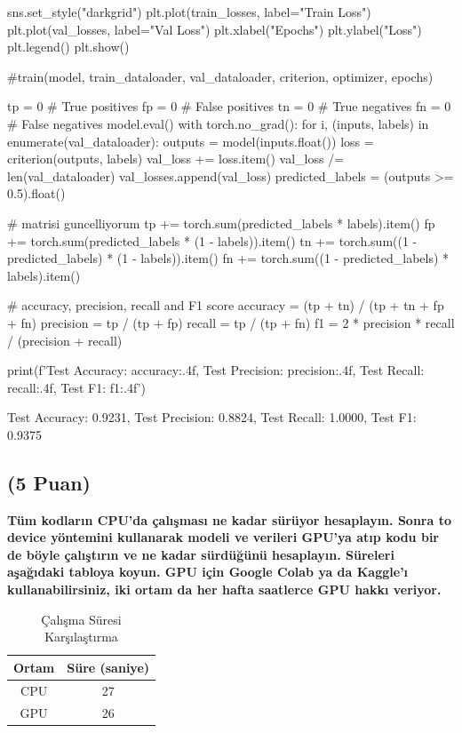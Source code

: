 \documentclass[11pt]{article}
\begin{document}
\begin{python}
sns.set_style("darkgrid")
plt.plot(train_losses, label="Train Loss")
plt.plot(val_losses, label="Val Loss")
plt.xlabel("Epochs")
plt.ylabel("Loss")
plt.legend()
plt.show()

#train(model, train_dataloader, val_dataloader, criterion, optimizer, epochs)



tp = 0  # True positives
fp = 0  # False positives
tn = 0  # True negatives
fn = 0  # False negatives
model.eval()
with torch.no_grad():
      for i, (inputs, labels) in enumerate(val_dataloader):
              outputs = model(inputs.float())
              loss = criterion(outputs, labels)
              val_loss += loss.item()
val_loss /= len(val_dataloader)
val_losses.append(val_loss)
predicted_labels = (outputs >= 0.5).float()



# matrisi guncelliyorum
tp += torch.sum(predicted_labels * labels).item()
fp += torch.sum(predicted_labels * (1 - labels)).item()
tn += torch.sum((1 - predicted_labels) * (1 - labels)).item()
fn += torch.sum((1 - predicted_labels) * labels).item()




# accuracy, precision, recall and F1 score
accuracy = (tp + tn) / (tp + tn + fp + fn)
precision = tp / (tp + fp)
recall = tp / (tp + fn)
f1 = 2 * precision * recall / (precision + recall)

print(f'Test Accuracy: {accuracy:.4f}, Test Precision: {precision:.4f}, Test Recall: {recall:.4f}, Test F1: {f1:.4f}')
\end{python}

Test Accuracy: 0.9231, Test Precision: 0.8824, Test Recall: 1.0000, Test F1: 0.9375

\subsection{(5 Puan)} \textbf{Tüm kodların CPU'da çalışması ne kadar sürüyor hesaplayın. Sonra to device yöntemini kullanarak modeli ve verileri GPU'ya atıp kodu bir de böyle çalıştırın ve ne kadar sürdüğünü hesaplayın. Süreleri aşağıdaki tabloya koyun. GPU için Google Colab ya da Kaggle'ı kullanabilirsiniz, iki ortam da her hafta saatlerce GPU hakkı veriyor.}

\begin{table}[ht!]
    \centering
    \caption{Çalışma Süresi Karşılaştırma}
    \begin{tabular}{c|c}
        Ortam & Süre (saniye) \\\hline
        CPU & 27 \\
        GPU & 26\\
    \end{tabular}
    \label{tab:my_table}
\end{table}
\end{document}
